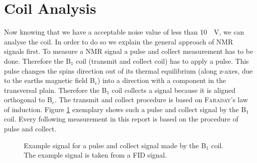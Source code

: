 \section{Coil Analysis}
\label{sec:CoilAnalyssis}
Now knowing that we have a acceptable noise value of less than \SI{10}{\mu \volt}, we can analyse the coil.
In order to do so we explain the general approach of NMR signals first.
To measure a NMR signal a pulse and collect measurement has to be done.
Therefore the B$_1$ coil (transmit and collect coil) has to apply a pulse.
This pulse changes the spins direction out of its thermal equilibrium (along z-axes, due to the earths magnetic field B$_e$) into a direction with a component in the transversal plain.
Therefore the B$_1$ coil collects a signal because it is aligned orthogonal to B$_e$.
The transmit and collect procedure is based on \textsc{Faraday}'s law of induction.
Figure \ref{fig: PulsandcollectValesignal} exemplary shows such a pulse and collect signal by the B$_1$ coil.
Every following measurement in this report is based on the procedure of pulse and collect.

\begin{figure}[H]
    \centering
    
    \caption[Example signal for a pulse and collect signal made by the B$_1$ coil.]{Example signal for a pulse and collect signal made by the B$_1$ coil.
    The example signal is taken from a FID signal.}
    \label{fig: PulsandcollectValesignal}
\end{figure}

